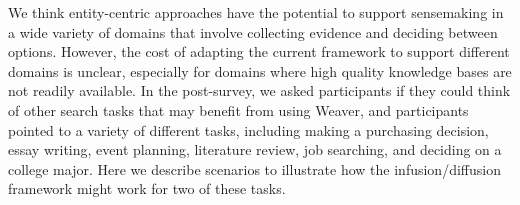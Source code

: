 

We think entity-centric approaches have the potential to support sensemaking in a wide variety of domains that involve collecting evidence and deciding between options. However, the cost of adapting the current framework to support different domains is unclear, especially for domains where high quality knowledge bases are not readily available. In the post-survey, we asked participants if they could think of other search tasks that may benefit from using Weaver, and participants pointed to a variety of different tasks, including making a purchasing decision, essay writing, event planning, literature review, job searching, and deciding on a college major. Here we describe scenarios to illustrate how the infusion/diffusion framework might work for two of these tasks.

